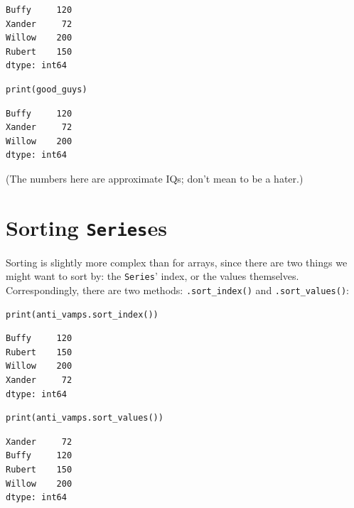 \begin{Verbatim}[fontsize=\scriptsize,samepage=true,frame=leftline,framesep=5mm,framerule=1mm]
Buffy     120
Xander     72
Willow    200
Rubert    150
dtype: int64
\end{Verbatim}

\begin{Verbatim}[fontsize=\scriptsize,samepage=true,frame=single,framesep=3mm]
print(good_guys)
\end{Verbatim}
\vspace{-.3in}

\begin{Verbatim}[fontsize=\scriptsize,samepage=true,frame=leftline,framesep=5mm,framerule=1mm]
Buffy     120
Xander     72
Willow    200
dtype: int64
\end{Verbatim}

(The numbers here are approximate IQs; don't mean to be a hater.)


\section{Sorting \texttt{Series}es}

Sorting is slightly more complex than for arrays, since there are two things we
might want to sort by: the \texttt{Series}' index, or the values themselves.
Correspondingly, there are two methods: \texttt{.sort\_index()} and
\texttt{.sort\_values()}:

\begin{Verbatim}[fontsize=\small,samepage=true,frame=single,framesep=3mm]
print(anti_vamps.sort_index())
\end{Verbatim}
\vspace{-.3in}

\begin{Verbatim}[fontsize=\small,samepage=true,frame=leftline,framesep=5mm,framerule=1mm]
Buffy     120
Rubert    150
Willow    200
Xander     72
dtype: int64
\end{Verbatim}

\begin{Verbatim}[fontsize=\small,samepage=true,frame=single,framesep=3mm]
print(anti_vamps.sort_values())
\end{Verbatim}
\vspace{-.3in}

\begin{Verbatim}[fontsize=\small,samepage=true,frame=leftline,framesep=5mm,framerule=1mm]
Xander     72
Buffy     120
Rubert    150
Willow    200
dtype: int64
\end{Verbatim}

